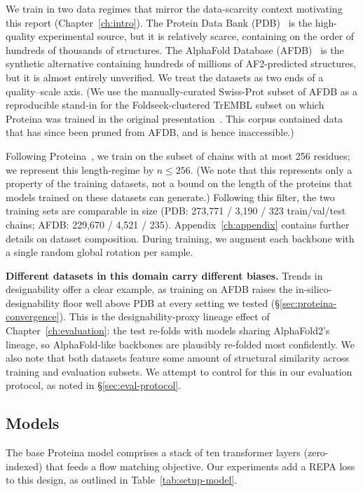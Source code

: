 \documentclass[12pt,a4paper,twoside]{report}
\begin{document}
We train in two data regimes that mirror the data-scarcity context motivating this report (Chapter~\ref{ch:intro}). The Protein Data Bank (PDB)~\cite{PDB} is the high-quality experimental source, but it is relatively scarce, containing on the order of hundreds of thousands of structures. The AlphaFold Database (AFDB)~\cite{AFDB} is the synthetic alternative containing hundreds of millions of AF2-predicted structures, but it is almost entirely unverified. We treat the datasets as two ends of a quality--scale axis. (We use the manually-curated Swiss-Prot subset of AFDB as a reproducible stand-in for the Foldseek-clustered TrEMBL subset on which Proteina was trained in the original presentation~\cite{Proteina}. This corpus contained data that has since been pruned from AFDB, and is hence inaccessible.)

Following Proteina~\cite{Proteina}, we train on the subset of chains with at most 256 residues; we represent this length-regime by $n{\le}256$. (We note that this represents only a property of the training datasets, not a bound on the length of the proteins that models trained on these datasets can generate.) Following this filter, the two training sets are comparable in size (PDB: 273{,}771 / 3{,}190 / 323 train/val/test chains; AFDB: 229{,}670 / 4{,}521 / 235). Appendix~\ref{ch:appendix} contains further details on dataset composition. During training, we augment each backbone with a single random global rotation per sample.

\textbf{Different datasets in this domain carry different biases.} Trends in designability offer a clear example, as training on AFDB raises the in-silico-designability floor well above PDB at every setting we tested (\S\ref{sec:proteina-convergence}). This is the designability-proxy lineage effect of Chapter~\ref{ch:evaluation}: the test re-folds with models sharing AlphaFold2's lineage, so AlphaFold-like backbones are plausibly re-folded most confidently. We also note that both datasets feature some amount of structural similarity across training and evaluation subsets. We attempt to control for this in our evaluation protocol, as noted in \S\ref{sec:eval-protocol}.
\subsection{Models}

The base Proteina model comprises a stack of ten transformer layers (zero-indexed) that feeds a flow matching objective. Our experiments add a REPA loss to this design, as outlined in Table~\ref{tab:setup-model}.
\end{document}

